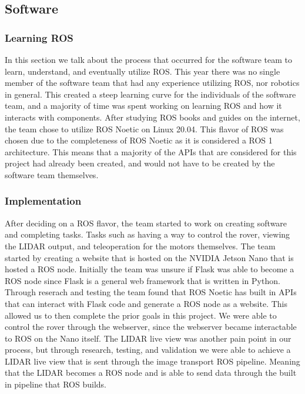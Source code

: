 \documentclass[a4paper, 10pt]{article}
\begin{document}
    \subsection{Software}
    \subsubsection*{Learning ROS}
    In this section we talk about the process that occurred for the software team to learn, understand, and eventually utilize ROS. This year there was no single member of the software team that had any experience utilizing ROS, nor robotics in general. This created a steep learning curve for the individuals of the software team, and a majority of time was spent working on learning ROS and how it interacts with components. After studying ROS books and guides on the internet, the team chose to utilize ROS Noetic on Linux 20.04. This flavor of ROS was chosen due to the completeness of ROS Noetic as it is considered a ROS 1 architecture. This means that a majority of the APIs that are considered for this project had already been created, and would not have to be created by the software team themselves. 

    \subsubsection*{Implementation}
    After deciding on a ROS flavor, the team started to work on creating software and completing tasks. Tasks such as having a way to control the rover, viewing the LIDAR output, and teleoperation for the motors themselves. The team started by creating a website that is hosted on the NVIDIA Jetson Nano that is hosted a ROS node. Initially the team was unsure if Flask was able to become a ROS node since Flask is a general web framework that is written in Python. Through reserach and testing the team found that ROS Noetic has built in APIs that can interact with Flask code and generate a ROS node as a website. This allowed us to then complete the prior goals in this project. We were able to control the rover through the webserver, since the webserver became interactable to ROS on the Nano itself. The LIDAR live view was another pain point in our process, but through research, testing, and validation we were able to achieve a LIDAR live view that is sent through the image transport ROS pipeline. Meaning that the LIDAR becomes a ROS node and is able to send data through the built in pipeline that ROS builds. 
\end{document}
